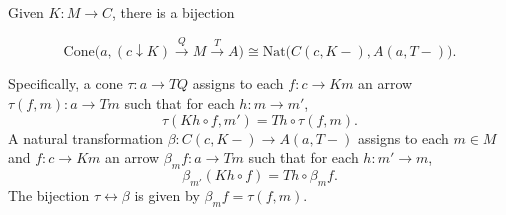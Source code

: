 Given $K: M \to C$, there is a bijection

$$\mathrm{Cone}\bigl(a, (c \downarrow K) \xrightarrow{Q} M \xrightarrow{T} A\bigr) \cong \mathrm{Nat}\bigl(C(c, K-), A(a, T-)\bigr).$$

Specifically, a cone $\tau: a \to TQ$ assigns to each $f: c \to Km$ an arrow $\tau(f, m): a \to Tm$ such that for each $h: m \to m'$,
$$\tau(Kh \circ f, m') = Th \circ \tau(f, m).$$
A natural transformation $\beta: C(c, K-) \to A(a, T-)$ assigns to each $m \in M$ and $f: c \to Km$ an arrow $\beta_m f: a \to Tm$ such that for each $h: m' \to m$,
$$\beta_{m'}(Kh \circ f) = Th \circ \beta_m f.$$
The bijection $\tau \leftrightarrow \beta$ is given by $\beta_m f = \tau(f, m)$.
